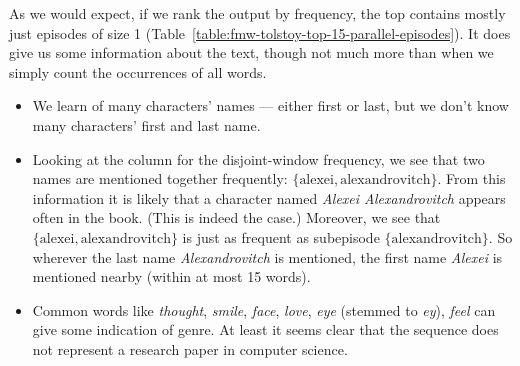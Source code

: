 As we would expect, if we rank the output by frequency, the top contains mostly just episodes of size 1 (Table~\ref{table:fmw-tolstoy-top-15-parallel-episodes}). It does give us some information about the text, though not much more than when we simply count the occurrences of all words.

\begin{itemize}
\item We learn of many characters' names --- either first or last, but we don't know many characters' first and last name.
\item Looking at the column for the disjoint-window frequency, we see that two names are mentioned together frequently: $ \{ \text{alexei}, \text{alexandrovitch} \} $. From this information it is likely that a character named \emph{Alexei Alexandrovitch} appears often in the book. (This is indeed the case.) Moreover, we see that $ \{ \text{alexei}, \text{alexandrovitch} \} $ is just as frequent as subepisode $ \{ \text{alexandrovitch} \} $. So wherever the last name \emph{Alexandrovitch} is mentioned, the first name \emph{Alexei} is mentioned nearby (within at most 15 words).
\item Common words like \emph{thought}, \emph{smile}, \emph{face}, \emph{love}, \emph{eye} (stemmed to \emph{ey}), \emph{feel} can give some indication of genre. At least it seems clear that the sequence does not represent a research paper in computer science.

\end{itemize}

